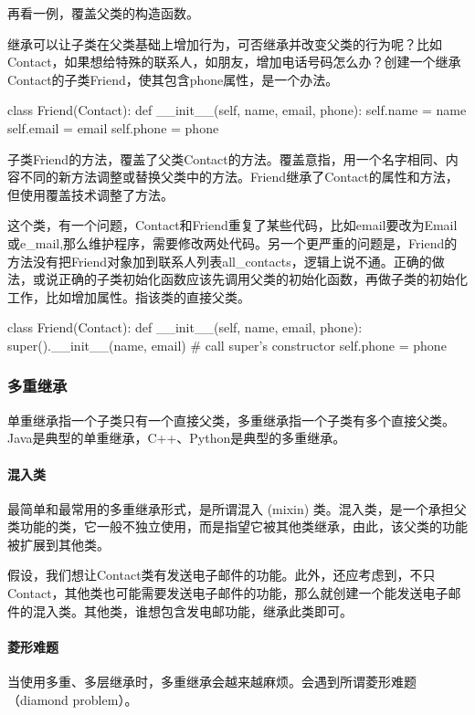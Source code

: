 再看一例，覆盖父类的构造函数。

继承可以让子类在父类基础上增加行为，可否继承并改变父类的行为呢？比如Contact，如果想给特殊的联系人，如朋友，增加电话号码怎么办？创建一个继承Contact的子类Friend，使其包含phone属性，是一个办法。
\begin{python}
class Friend(Contact):
    def __init__(self, name, email, phone):
        self.name = name
        self.email = email
        self.phone = phone
\end{python}
子类Friend的方法，覆盖了父类Contact的方法。覆盖意指，用一个名字相同、内容不同的新方法调整或替换父类中的方法。Friend继承了Contact的属性和方法，但使用覆盖技术调整了方法。

这个类，有一个问题，Contact和Friend重复了某些代码，比如email要改为Email或e\_mail,那么维护程序，需要修改两处代码。另一个更严重的问题是，Friend的方法没有把Friend对象加到联系人列表all\_contacts，逻辑上说不通。正确的做法，或说正确的子类初始化函数应该先调用父类的初始化函数，再做子类的初始化工作，比如增加属性。指该类的直接父类。
\begin{python}
class Friend(Contact):
    def __init__(self, name, email, phone):
        super().__init__(name, email)  # call super's constructor
        self.phone = phone
\end{python}
\subsubsection{多重继承}
单重继承指一个子类只有一个直接父类，多重继承指一个子类有多个直接父类。Java是典型的单重继承，C++、Python是典型的多重继承。
\paragraph{混入类}
最简单和最常用的多重继承形式，是所谓混入 (mixin) 类。混入类，是一个承担父类功能的类，它一般不独立使用，而是指望它被其他类继承，由此，该父类的功能被扩展到其他类。

假设，我们想让Contact类有发送电子邮件的功能。此外，还应考虑到，不只Contact，其他类也可能需要发送电子邮件的功能，那么就创建一个能发送电子邮件的混入类。其他类，谁想包含发电邮功能，继承此类即可。
\paragraph{菱形难题}
当使用多重、多层继承时，多重继承会越来越麻烦。会遇到所谓菱形难题（diamond problem）。

